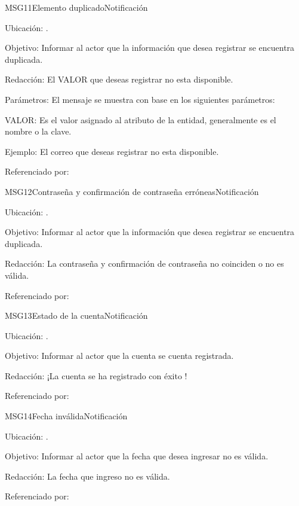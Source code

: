 \begin{mensaje}{MSG11}{Elemento duplicado}{Notificación}
	\item[Ubicación:] \msjEmergente.
	\item[Objetivo:] Informar al actor que la información que desea registrar se encuentra duplicada.
	\item[Redacción:] El VALOR que deseas registrar no esta disponible.
	\item[Parámetros:] El mensaje se muestra con base en los siguientes parámetros:
	\begin{Citemize}
		\item VALOR: Es el valor asignado al atributo de la entidad, generalmente es el nombre o la clave.
	\end{Citemize}
	\item[Ejemplo:] El correo que deseas registrar no esta disponible.
	\item[Referenciado por:] 
\end{mensaje}

\begin{mensaje}{MSG12}{Contraseña y confirmación de contraseña erróneas}{Notificación}
	\item[Ubicación:] \msjEmergente.
	\item[Objetivo:] Informar al actor que la información que desea registrar se encuentra duplicada.
	\item[Redacción:] La contraseña y confirmación de contraseña no coinciden o no es válida.
	\item[Referenciado por:] 
\end{mensaje}

\begin{mensaje}{MSG13}{Estado de la cuenta}{Notificación}
	\item[Ubicación:] \msjEmergente.
	\item[Objetivo:] Informar al actor que la cuenta se cuenta registrada.
	\item[Redacción:] ¡La cuenta se ha registrado con éxito !
	\item[Referenciado por:] 
\end{mensaje}

\begin{mensaje}{MSG14}{Fecha inválida}{Notificación}
	\item[Ubicación:] \msjEmergente.
	\item[Objetivo:] Informar al actor que la fecha que desea ingresar no es válida.
	\item[Redacción:] La fecha que ingreso no es válida.
	\item[Referenciado por:] 
\end{mensaje}

